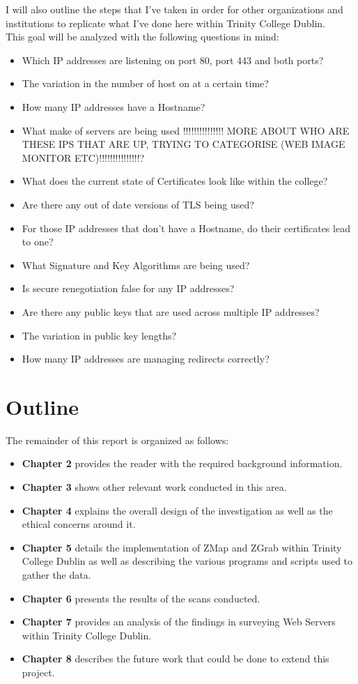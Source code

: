 \documentclass[a4wide,leqno,12pt]{report}
\begin{document}
I will also outline the steps that I've taken in order for other organizations and institutions to replicate what I've done here within Trinity College Dublin.\\


This goal will be analyzed with the following questions in mind:
\begin{itemize}
  \item Which IP addresses are listening on port 80, port 443 and both ports?
  \item The variation in the number of host on at a certain time?
  \item How many IP addresses have a Hostname?
  \item What make of servers are being used !!!!!!!!!!!!!!! MORE ABOUT WHO ARE THESE IPS THAT ARE UP, TRYING TO CATEGORISE (WEB IMAGE MONITOR ETC)!!!!!!!!!!!!!!!?
  \item What does the current state of Certificates look like within the college?
  \item Are there any out of date versions of TLS being used?
  \item For those IP addresses that don't have a Hostname, do their certificates lead to one?
  \item What Signature and Key Algorithms are being used?
  \item Is secure renegotiation false for any IP addresses?
  \item Are there any public keys that are used across multiple IP addresses?
  \item The variation in public key lengths?
  \item How many IP addresses are managing redirects correctly?
  
\end{itemize}
\section{Outline} 
The remainder of this report is organized as follows:\\
\begin{itemize}
\item\textbf{Chapter 2} provides the reader with the required background information.
\item\textbf{Chapter 3} shows other relevant work conducted in this area.
\item\textbf{Chapter 4} explains the overall design of the investigation as well as the ethical concerns around it.
\item\textbf{Chapter 5} details the implementation of ZMap and ZGrab within Trinity College Dublin as well as describing the various programs and scripts used to gather the data.
\item\textbf{Chapter 6} presents the results of the scans conducted.
\item\textbf{Chapter 7} provides an analysis of the findings in surveying Web Servers within Trinity College Dublin.
\item\textbf{Chapter 8} describes the future work that could be done to extend this project.
\end{itemize}
\end{document}
